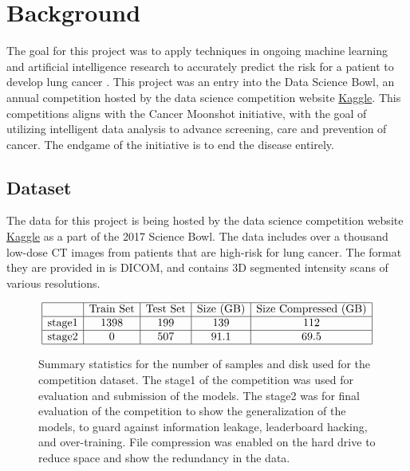 \documentclass[conference,11pt]{IEEEtran}
\begin{document}
\section{Background}

The goal for this project was to apply techniques in ongoing machine learning and artificial intelligence research to accurately predict the risk for a patient to develop lung cancer \cite{ronneberger_u-net:_2015}. This project was an entry into the Data Science Bowl, an annual competition hosted by the data science competition website  \href{https://www.kaggle.com/c/data-science-bowl-2017}{Kaggle}. This competitions aligns with the Cancer Moonshot initiative, with the goal of utilizing intelligent data analysis to advance screening, care and prevention of cancer. The endgame of the initiative is to end the disease entirely.

\subsection{Dataset}
The data for this project is being hosted by the data science competition website \href{https://www.kaggle.com/c/data-science-bowl-2017}{Kaggle} as a part of the 2017 Science Bowl. The data includes over a thousand low-dose CT images from patients that are high-risk for lung cancer. The format they are provided in is DICOM, and contains 3D segmented intensity scans of various resolutions.

\begin{figure}[]
    \centering
    \[
      \begin{array} {|c|c|c|c|c|}
        \hline
        & \textnormal{Train Set} & \textnormal{Test Set} & \textnormal{Size (GB)} & \textnormal{Size Compressed (GB)} \\ \hline
        \textnormal{stage1}  & 1398 & 199 & 139 & 112 \\ \hline
        \textnormal{stage2}  & 0 & 507 & 91.1 & 69.5\\ \hline
      \end{array}
    \]
    \caption{Summary statistics for the number of samples and disk used for the competition dataset. The stage1 of the competition was used for evaluation and submission of the models. The stage2 was for final evaluation of the competition to show the generalization of the models, to guard against information leakage, leaderboard hacking, and over-training. File compression was enabled on the hard drive to reduce space and show the redundancy in the data.}
    \label{fig:dataset}
\end{figure}
\end{document}

